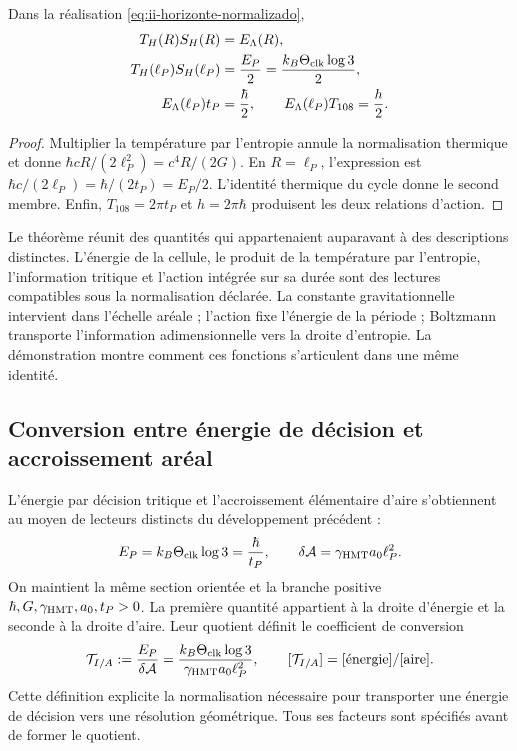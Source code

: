 \begin{theorem}
Dans la réalisation \eqref{eq:ii-horizonte-normalizado},
\begin{align}
 T_H(R)S_H(R)&=E_\Lambda(R),\\
 T_H(\ell_P)S_H(\ell_P)&=\frac{E_P}{2}
 =\frac{k_B\Theta_{\rm clk}\log3}{2},\\
 E_\Lambda(\ell_P)t_P&=\frac{\hbar}{2},\qquad
 E_\Lambda(\ell_P)T_{108}=\frac h2.
\end{align}
\end{theorem}
\begin{proof}
Multiplier la température par l’entropie annule la normalisation
thermique et donne \(\hbar cR/(2\ell_P^2)=c^4R/(2G)\).
En \(R=\ell_P\), l’expression est \(\hbar c/(2\ell_P)
=\hbar/(2t_P)=E_P/2\). L’identité thermique du cycle donne
le second membre. Enfin, \(T_{108}=2\pi t_P\) et
\(h=2\pi\hbar\) produisent les deux relations d’action.
\end{proof}

Le théorème réunit des quantités qui appartenaient auparavant à des descriptions
distinctes. L’énergie de la cellule, le produit de la température par l’entropie,
l’information tritique et l’action intégrée sur sa durée sont
des lectures compatibles sous la normalisation déclarée. La constante
gravitationnelle intervient dans l’échelle aréale ; l’action fixe l’énergie
de la période ; Boltzmann transporte l’information adimensionnelle vers la
droite d’entropie. La démonstration montre comment ces fonctions
s’articulent dans une même identité.

\subsection{Conversion entre énergie de décision et accroissement aréal}
\label{sec:ii-conversion-informacion-area}

L’énergie par décision tritique et l’accroissement élémentaire d’aire
s’obtiennent au moyen de lecteurs distincts du développement précédent :
\begin{equation}
 E_P=k_B\Theta_{\rm clk}\log3=\frac{\hbar}{t_P},
 \qquad
 \delta\mathcal A=\gamma_{\mathrm{HMT}}a_0\ell_P^2.
 \label{eq:ii-confluencia-cuanto-energia-area}
\end{equation}
On maintient la même section orientée et la branche positive
\(\hbar,G,\gamma_{\mathrm{HMT}},a_0,t_P>0\). La première quantité
appartient à la droite d’énergie et la seconde à la droite d’aire.
Leur quotient définit le coefficient de conversion
\begin{equation}
 \mathcal T_{I/A}
 :=\frac{E_P}{\delta\mathcal A}
 =\frac{k_B\Theta_{\rm clk}\log3}
        {\gamma_{\mathrm{HMT}}a_0\ell_P^2},
 \qquad [\mathcal T_{I/A}]=[\text{énergie}]/[\text{aire}].
 \label{eq:ii-confluencia-tension}
\end{equation}
Cette définition explicite la normalisation nécessaire pour transporter
une énergie de décision vers une résolution géométrique. Tous ses facteurs
sont spécifiés avant de former le quotient.


